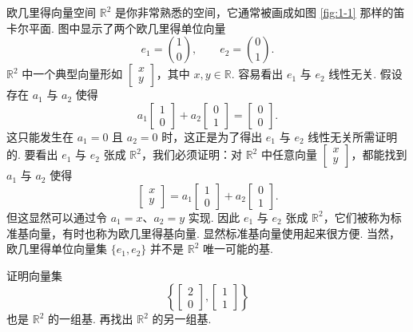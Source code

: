 欧几里得向量空间 $\mathbb{R}^2$ 是你非常熟悉的空间，它通常被画成如图 \ref{fig:1-1} 那样的笛卡尔平面. 图中显示了两个欧几里得单位向量
\[
e_1=\binom{1}{0},\qquad e_2=\binom{0}{1}.
\]
$\mathbb{R}^2$ 中一个典型向量形如 $\begin{bmatrix}x\\y\end{bmatrix}$，其中 $x,y\in\mathbb{R}$. 容易看出 $e_1$ 与 $e_2$ 线性无关. 假设存在 $a_1$ 与 $a_2$ 使得
\[
a_1\begin{bmatrix}1\\0\end{bmatrix}+a_2\begin{bmatrix}0\\1\end{bmatrix}=\begin{bmatrix}0\\0\end{bmatrix}.
\]
这只能发生在 $a_1=0$ 且 $a_2=0$ 时，这正是为了得出 $e_1$ 与 $e_2$ 线性无关所需证明的. 要看出 $e_1$ 与 $e_2$ 张成 $\mathbb{R}^2$，我们必须证明：对 $\mathbb{R}^2$ 中任意向量 $\begin{bmatrix}x\\y\end{bmatrix}$，都能找到 $a_1$ 与 $a_2$ 使得
\[
\begin{bmatrix}x\\y\end{bmatrix}=a_1\begin{bmatrix}1\\0\end{bmatrix}+a_2\begin{bmatrix}0\\1\end{bmatrix}.
\]
但这显然可以通过令 $a_1=x$、$a_2=y$ 实现. 因此 $e_1$ 与 $e_2$ 张成 $\mathbb{R}^2$，它们被称为标准基向量，有时也称为欧几里得基向量. 显然标准基向量使用起来很方便. 当然，欧几里得单位向量集 $\{e_1,e_2\}$ 并不是 $\mathbb{R}^2$ 唯一可能的基.

\begin{question}\label{q:1-2}
证明向量集
\[
\left\{\begin{bmatrix}2\\0\end{bmatrix},\begin{bmatrix}1\\1\end{bmatrix}\right\}
\]
也是 $\mathbb{R}^2$ 的一组基. 再找出 $\mathbb{R}^2$ 的另一组基.
\end{question}

